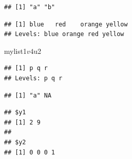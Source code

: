 \documentclass[]{book}
\newenvironment{Shaded}{\begin{snugshade}}{\end{snugshade}}
\newcommand{\KeywordTok}[1]{\textcolor[rgb]{0.13,0.29,0.53}{\textbf{{#1}}}}
\newcommand{\DataTypeTok}[1]{\textcolor[rgb]{0.13,0.29,0.53}{{#1}}}
\newcommand{\DecValTok}[1]{\textcolor[rgb]{0.00,0.00,0.81}{{#1}}}
\newcommand{\StringTok}[1]{\textcolor[rgb]{0.31,0.60,0.02}{{#1}}}
\newcommand{\CommentTok}[1]{\textcolor[rgb]{0.56,0.35,0.01}{\textit{{#1}}}}
\newcommand{\OtherTok}[1]{\textcolor[rgb]{0.56,0.35,0.01}{{#1}}}
\newcommand{\NormalTok}[1]{{#1}}
\theoremstyle{definition}
\theoremstyle{definition}
\theoremstyle{remark}
\begin{document}
\begin{verbatim}
## [1] "a" "b"
\end{verbatim}

\begin{Shaded}
\end{Shaded}

\begin{verbatim}
## [1] blue   red    orange yellow
## Levels: blue orange red yellow
\end{verbatim}

\begin{Shaded}
\begin{Highlighting}[]
\NormalTok{mylist1$v4$u2}
\end{Highlighting}
\end{Shaded}

\begin{verbatim}
## [1] p q r
## Levels: p q r
\end{verbatim}

\begin{Shaded}
\end{Shaded}

\begin{verbatim}
## [1] "a" NA
\end{verbatim}

\begin{Shaded}
\end{Shaded}

\begin{verbatim}
## $y1
## [1] 2 9
## 
## $y2
## [1] 0 0 0 1
\end{verbatim}
\end{document}
